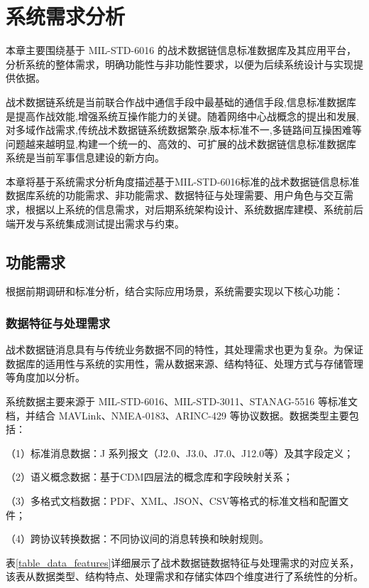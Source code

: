 \chapter{系统需求分析}

本章主要围绕基于 MIL-STD-6016 的战术数据链信息标准数据库及其应用平台，分析系统的整体需求，明确功能性与非功能性要求，以便为后续系统设计与实现提供依据。

战术数据链系统是当前联合作战中通信手段中最基础的通信手段,信息标准数据库是提高作战效能,增强系统互操作能力的关键。随着网络中心战概念的提出和发展,对多域作战需求,传统战术数据链系统数据繁杂,版本标准不一,多链路间互操困难等问题越来越明显,构建一个统一的、高效的、可扩展的战术数据链信息标准数据库系统是当前军事信息建设的新方向。

本章将基于系统需求分析角度描述基于MIL-STD-6016标准的战术数据链信息标准数据库系统的功能需求、非功能需求、数据特征与处理需要、用户角色与交互需求，根据以上系统的信息需求，对后期系统架构设计、系统数据库建模、系统前后端开发与系统集成测试提出需求与约束。

\section{功能需求}

根据前期调研和标准分析，结合实际应用场景，系统需要实现以下核心功能：

\subsection{数据特征与处理需求}
战术数据链消息具有与传统业务数据不同的特性，其处理需求也更为复杂。为保证数据库的适用性与系统的实用性，需从数据来源、结构特征、处理方式与存储管理等角度加以分析\cite{baek2016_jsac}。

系统数据主要来源于 {MIL-STD-6016}、{MIL-STD-3011}、{STANAG-5516} 等标准文档，并结合 {MAVLink}、{NMEA-0183}、{ARINC-429} 等协议数据。数据类型主要包括：

（1）标准消息数据：J 系列报文（J2.0、J3.0、J7.0、J12.0等）及其字段定义；

（2）语义概念数据：基于CDM四层法的概念库和字段映射关系；

（3）多格式文档数据：PDF、XML、JSON、CSV等格式的标准文档和配置文件；

（4）跨协议转换数据：不同协议间的消息转换和映射规则。

表\ref{table_data_features}详细展示了战术数据链数据特征与处理需求的对应关系，该表从数据类型、结构特点、处理需求和存储实体四个维度进行了系统性的分析。

